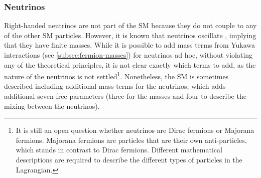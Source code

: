 \subsubsection{Neutrinos}
Right-handed neutrinos are not part of the SM because they do not couple to any of the other SM particles.
However, it is known that neutrinos oscillate \cite{Gonzalez_Garcia_2008}, implying that they have finite masses.
While it is possible to add mass terms from Yukawa interactions (see \cref{subsec:fermion-masses}) for neutrinos ad hoc, without violating any of the theoretical principles, it is not clear exactly which terms to add, as the nature of the neutrinos is not settled\footnote{It is still an open question whether neutrinos are Dirac fermions or Majorana fermions. Majorana fermions are particles that are their own anti-particles, which stands in contrast to Dirac fermions. Different mathematical descriptions are required to describe the different types of particles in the Lagrangian.}. 
Nonetheless, the SM is sometimes described including additional mass terms for the neutrinos, which adds additional seven free parameters (three for the masses and four to describe the mixing between the neutrinos).




